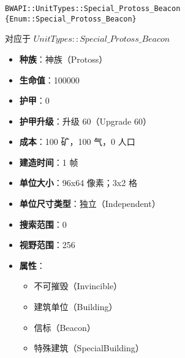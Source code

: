 \begin{tcolorbox}[colback=white, colframe=black!60!white, title=Special\_Protoss\_Beacon(), arc=0mm]
    \begin{verbatim}
BWAPI::UnitTypes::Special_Protoss_Beacon {Enum::Special_Protoss_Beacon}
    \end{verbatim}
    对应于  $UnitTypes::Special\_Protoss\_Beacon$ 
    \begin{itemize}
        \item \textbf{种族}：神族（Protoss）
        \item \textbf{生命值}：100000
        \item \textbf{护甲}：0
        \item \textbf{护甲升级}：升级 60（Upgrade 60）
        \item \textbf{成本}：100 矿，100 气，0 人口
        \item \textbf{建造时间}：1 帧
        \item \textbf{单位大小}：96x64 像素；3x2 格
        \item \textbf{单位尺寸类型}：独立（Independent）
        \item \textbf{搜索范围}：0
        \item \textbf{视野范围}：256
        \item \textbf{属性}：
            \begin{itemize}
                \item 不可摧毁（Invincible）
                \item 建筑单位（Building）
                \item 信标（Beacon）
                \item 特殊建筑（SpecialBuilding）
            \end{itemize}
    \end{itemize}
\end{tcolorbox}

